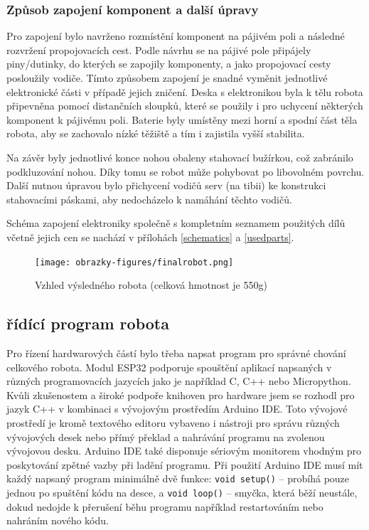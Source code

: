 \subsubsection*{Způsob zapojení komponent a další úpravy}
Pro zapojení bylo navrženo rozmístění komponent na pájivém poli a následné rozvržení propojovacích cest. Podle návrhu se na pájivé pole připájely piny/dutinky, do kterých se zapojily komponenty, a jako propojovací cesty posloužily vodiče. Tímto způsobem zapojení je snadné vyměnit jednotlivé elektronické části v případě jejich zničení. Deska s elektronikou byla k tělu robota připevněna pomocí distančních sloupků, které se použily i pro uchycení některých komponent k pájivému poli. Baterie byly umístěny mezi horní a spodní část těla robota, aby se zachovalo nízké těžiště a tím i zajistila vyšší stabilita.

Na závěr byly jednotlivé konce nohou obaleny stahovací bužírkou, což zabránilo podkluzování nohou. Díky tomu se robot může pohybovat po libovolném povrchu. Další nutnou úpravou bylo přichycení vodičů serv (na tibii) ke konstrukci stahovacími páskami, aby nedocházelo k namáhání těchto vodičů.

Schéma zapojení elektroniky společně s kompletním seznamem použitých dílů včetně jejich cen se nachází v přílohách \ref{schematics} a \ref{usedparts}.


\begin{figure}[hbt]
	\centering
	\texttt{[image: obrazky-figures/finalrobot.png]}
	\caption{Vzhled výsledného robota (celková hmotnost je 550g)}
    \label{finalrobot}
\end{figure}

\subsection*{řídící program robota}
Pro řízení hardwarových částí bylo třeba napsat program pro správné chování celkového robota. Modul ESP32 podporuje spouštění aplikací napsaných v různých programovacích jazycích jako je například C, C++ nebo Micropython. Kvůli zkušenostem a široké podpoře knihoven pro hardware jsem se rozhodl pro jazyk C++ v kombinaci s vývojovým prostředím Arduino IDE. Toto vývojové prostředí je kromě textového editoru vybaveno i nástroji pro správu různých vývojových desek nebo přímý překlad a nahrávání programu na zvolenou vývojovou desku. Arduino IDE také disponuje sériovým monitorem vhodným pro poskytování zpětné vazby při ladění programu. Při použití Arduino IDE musí mít každý napsaný program minimálně dvě funkce: \texttt{void setup()} -- probíhá pouze jednou po spuštění kódu na desce, a \texttt{void loop()} -- smyčka, která běží neustále, dokud nedojde k přerušení běhu programu například restartováním nebo nahráním nového kódu.


